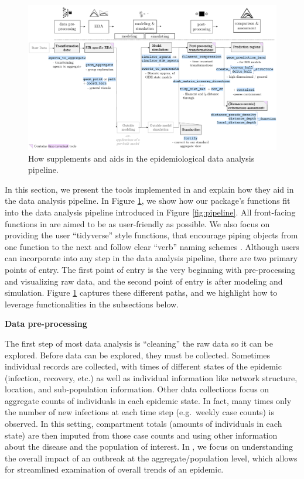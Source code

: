 \documentclass[
  shortnames]{jss}
\begin{document}
\afterpage{\clearpage}
\begin{figure}
    \centering
    \includegraphics[width = 1\textwidth]{images/pipeline2_1.pdf}
    \caption{How  supplements and aids in the epidemiological data analysis pipeline.}
    \label{fig:pipeline2}
\end{figure}

In this section, we present the tools implemented in 
and explain how they aid in the data analysis pipeline. In Figure
\ref{fig:pipeline2}, we show how our package's functions fit into the
data analysis pipeline introduced in Figure \ref{fig:pipeline}. All
front-facing functions in  are aimed to be as
user-friendly as possible. We also focus on providing the user
``tidyverse'' style functions, that encourage piping objects from one
function to the next and follow clear ``verb'' naming schemes
\citep{Wickham2019}. Although users can incorporate 
into any step in the data analysis pipeline, there are two primary
points of entry. The first point of entry is the very beginning with
pre-processing and visualizing raw data, and the second point of entry
is after modeling and simulation. Figure \ref{fig:pipeline2} captures
these different paths, and we highlight how to leverage 
functionalities in the subsections below.

\textbf{Data pre-processing}

The first step of most data analysis is ``cleaning'' the raw data so it
can be explored. Before data can be explored, they must be collected.
Sometimes individual records are collected, with times of different
states of the epidemic (infection, recovery, etc.) as well as individual
information like network structure, location, and sub-population
information. Other data collections focus on aggregate counts of
individuals in each epidemic state. In fact, many times only the number
of new infections at each time step (e.g.~weekly case counts) is
observed. In this setting, compartment totals (amounts of individuals in
each state) are then imputed from those case counts and using other
information about the disease and the population of interest. In
, we focus on understanding the overall impact of an
outbreak at the aggregate/population level, which allows for streamlined
examination of overall trends of an epidemic.
\end{document}
